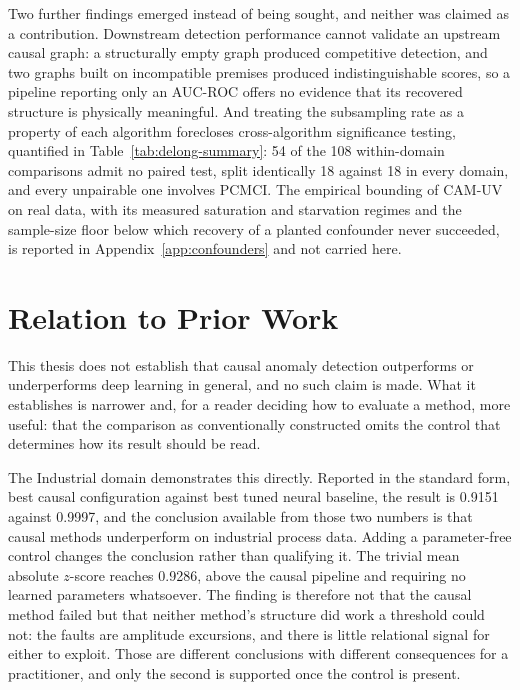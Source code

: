 Two further findings emerged instead of being sought, and neither was claimed as a contribution. Downstream detection performance cannot validate an upstream causal graph: a structurally empty graph produced competitive detection, and two graphs built on incompatible premises produced indistinguishable scores, so a pipeline reporting only an AUC-ROC offers no evidence that its recovered structure is physically meaningful. And treating the subsampling rate as a property of each algorithm forecloses cross-algorithm significance testing, quantified in Table~\ref{tab:delong-summary}: 54 of the 108 within-domain comparisons admit no paired test, split identically 18 against 18 in every domain, and every unpairable one involves PCMCI. The empirical bounding of CAM-UV on real data, with its measured saturation and starvation regimes and the sample-size floor below which recovery of a planted confounder never succeeded, is reported in Appendix~\ref{app:confounders} and not carried here.

\section{Relation to Prior Work}
\label{sec:disc-prior}

This thesis does not establish that causal anomaly detection outperforms or underperforms deep learning in general, and no such claim is made. What it establishes is narrower and, for a reader deciding how to evaluate a method, more useful: that the comparison as conventionally constructed omits the control that determines how its result should be read.

The Industrial domain demonstrates this directly. Reported in the standard form, best causal configuration against best tuned neural baseline, the result is 0.9151 against 0.9997, and the conclusion available from those two numbers is that causal methods underperform on industrial process data. Adding a parameter-free control changes the conclusion rather than qualifying it. The trivial mean absolute $z$-score reaches 0.9286, above the causal pipeline and requiring no learned parameters whatsoever. The finding is therefore not that the causal method failed but that neither method's structure did work a threshold could not: the faults are amplitude excursions, and there is little relational signal for either to exploit. Those are different conclusions with different consequences for a practitioner, and only the second is supported once the control is present.

